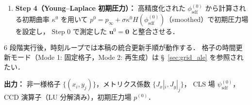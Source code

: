 \begin{tcolorbox}[algbox, title={ブートストラップ処理：初期化シーケンス（6 段階）}]
\begin{enumerate}
        $|\nabla\phi|$ の初期不整合を低減する．
        ただし，この 1 サイクル補正だけで
        $\bigl||\nabla\phi^{(0)}_\text{sdf}|-1\bigr|=\Ord{h^4}$ を自動的に与えるものではなく，
        実験では §~\ref{sec:verify_field_extension} の HFE 診断と同じ格子系列で
        初期 SDF 誤差を確認する必要がある．
        HFE 誤差伝播 $\varepsilon_\text{HFE} \lesssim \varepsilon_\text{sdf}\cdot|\nabla^k p|$
        ($k\le 6$) より局所 $\Ord{h^4}$ 誤差が界面曲率精度を律速するが，
        Step 4 Young--Laplace は時刻 0 の初期化のみである．
        したがって本ステップは HFE 本体の $\Ord{h^6}$ 設計精度を主張する根拠ではなく，
        初期圧力に低次 SDF 誤差を持ち込まないための事前整合化として扱う．
        以後の Step 4 では $\phi^{(0)}_\text{sdf}$ を用いる．
  \item \textbf{Step 4（Young--Laplace 初期圧力）：} 高精度化された
        $\phi^{(0)}_\text{sdf}$ から計算される初期曲率 $\kappa^0$ を用いて
        $p^0 = p_\infty + \sigma\kappa^0 H(\phi^{(0)}_\text{sdf})$（smoothed）で初期圧力場を設定し，
        Step 0 で測定した $\mathbf{u}^0=\mathbf{0}$ と整合させる．
\end{enumerate}
6 段階実行後，時刻ループでは本稿の統合更新手順が動作する．
格子の時間更新モード（Mode 1: 固定格子，Mode 2: 再生成）は §~\ref{sec:grid_ale} を参照されたい．

\textbf{出力：}
非一様格子 $\{(x_i, y_j)\}$，メトリクス係数 $\{J_x|_i, J_y|_j\}$，
CLS 場 $\psi^{(0)}_\text{sdf}$，CCD 演算子（LU 分解済み），初期圧力場 $p^{(0)}$．
\end{tcolorbox}

